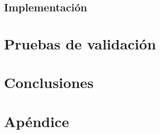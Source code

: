 \documentclass[11pt,a4paper]{book}
\begin{document}
\section{Implementación}


\chapter{Pruebas de validación}


\chapter{Conclusiones}


\printbibliography[heading=bibnumbered]

\appendix
\chapter{Apéndice}

\end{document}
